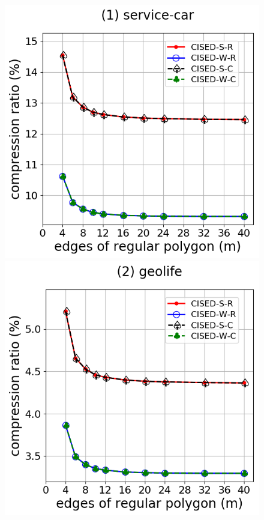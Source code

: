 {\begin{figure}[tb!]
\centering
\includegraphics[scale = 0.290]{Figures/Exp-M-e-60-CR-service.png}\hspace{1ex}
\includegraphics[scale = 0.290]{Figures/Exp-M-e-60-CR-geolife.png}\hspace{1ex}

\end{figure}}
